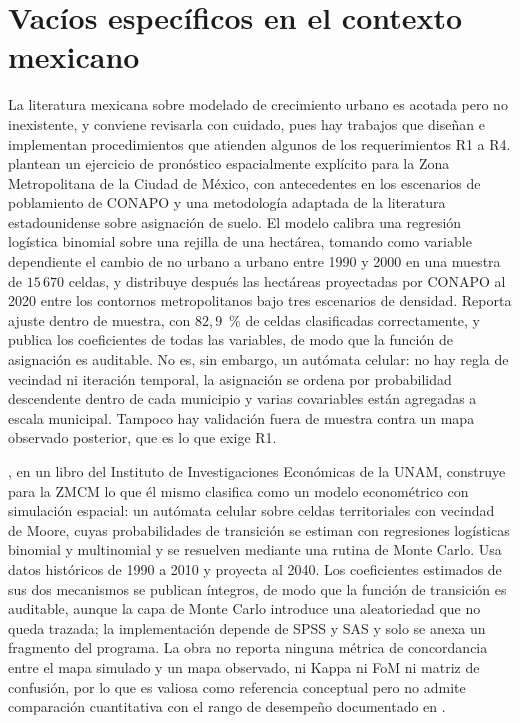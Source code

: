 


\section{Vacíos específicos en el contexto mexicano}
\label{sec:vacios-mexico}

La literatura mexicana sobre modelado de crecimiento urbano es acotada pero no
inexistente, y conviene revisarla con cuidado, pues hay trabajos que diseñan e
implementan procedimientos que atienden algunos de los requerimientos R1 a R4.
\textcite{SuarezDelgado2007} plantean un ejercicio de pronóstico espacialmente
explícito para la Zona Metropolitana de la Ciudad de México, con antecedentes
en los escenarios de poblamiento de CONAPO y una metodología adaptada de la
literatura estadounidense sobre asignación de suelo. El modelo calibra una
regresión logística binomial sobre una rejilla de una hectárea, tomando como
variable dependiente el cambio de no urbano a urbano entre 1990 y 2000 en una
muestra de $15\,670$ celdas, y distribuye después las hectáreas proyectadas por
CONAPO al 2020 entre los contornos metropolitanos bajo tres escenarios de
densidad. Reporta ajuste dentro de muestra, con $82{,}9$~\% de celdas
clasificadas correctamente, y publica los coeficientes de todas las variables,
de modo que la función de asignación es auditable. No es, sin embargo, un
autómata celular: no hay regla de vecindad ni iteración temporal, la asignación
se ordena por probabilidad descendente dentro de cada municipio y varias
covariables están agregadas a escala municipal. Tampoco hay validación fuera
de muestra contra un mapa observado posterior, que es lo que exige R1.

\textcite{RamirezHernandez2021}, en un libro del Instituto de Investigaciones
Económicas de la UNAM, construye para la ZMCM lo que él mismo clasifica como
un modelo econométrico con simulación espacial: un autómata celular sobre
celdas territoriales con vecindad de Moore, cuyas probabilidades de transición
se estiman con regresiones logísticas binomial y multinomial y se resuelven
mediante una rutina de Monte Carlo. Usa datos históricos de 1990 a 2010 y
proyecta al 2040. Los coeficientes estimados de sus dos mecanismos se publican
íntegros, de modo que la función de transición es auditable, aunque la capa de
Monte Carlo introduce una aleatoriedad que no queda trazada; la implementación
depende de SPSS y SAS y solo se anexa un fragmento del programa. La obra no
reporta ninguna métrica de concordancia entre el mapa simulado y un mapa
observado, ni Kappa ni FoM ni matriz de confusión, por lo que es valiosa como
referencia conceptual pero no admite comparación cuantitativa con el rango de
desempeño documentado en \textcite{pontius2008comparing}.

